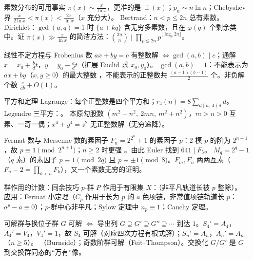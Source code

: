 \begin{结论}{素数分布的可用事实}
$\pi(x)\sim\frac{x}{\ln x}$，更准的是 $\operatorname{li}(x)$；$p_n\sim n\ln n$；Chebyshev 界 $\frac{x}{2\ln x}<\pi(x)<\frac{2x}{\ln x}$（$x$ 充分大）。
Bertrand：$n<p\le2n$ 总有素数。Dirichlet：$\gcd(a,q)=1$ 时 $\{a+kq\}$ 含无穷多素数，且在 $\varphi(q)$ 个剩余类中。证 $\pi(x)\gg\frac{x}{\ln x}$ 的简洁方法：$\binom{2n}{n}\mid\prod_{p\le2n}p^{\lfloor\log_p2n\rfloor}$。
\end{结论}

\begin{结论}{线性不定方程与 Frobenius 数}
$ax+by=c$ 有整数解 $\iff\gcd(a,b)\mid c$；通解 $x=x_0+\frac{b}{d}t$，$y=y_0-\frac adt$（扩展 Euclid 求 $x_0,y_0$）。
$\gcd(a,b)=1$：不能表示为 $ax+by$（$x,y\ge0$）的最大整数 ，不能表示的正整数共 $\frac{(a-1)(b-1)}2$ 个。非负解个数 $\frac{c}{ab}+O(1)$。
\end{结论}

\begin{结论}{平方和定理}
Lagrange：每个正整数是四个平方和；$r_4(n)=8\sum_{d\mid n,\ 4\nmid d}d$。Legendre 三平方：。
本原勾股数 $(m^2-n^2,\ 2mn,\ m^2+n^2)$，$m>n>0$ 互素、一奇一偶；$x^4+y^4=z^2$ 无正整数解（无穷递降）。
\end{结论}

\begin{结论}{Fermat 数与 Mersenne 数的素因子}
$F_n=2^{2^n}+1$ 的素因子 $p$：$2$ 模 $p$ 的阶为 $2^{n+1}$，故 $p\equiv1\pmod{2^{n+1}}$；$n\ge2$ 时更强 。由此 Euler 找到 $641\mid F_5$。
$M_q=2^q-1$（$q$ 素）的素因子 $p\equiv1\pmod{2q}$ 且 $p\equiv\pm1\pmod8$。$F_m,F_n$ 两两互素（$F_n-2=\prod_{k<n}F_k$），又一个素数无穷的证明。
\end{结论}

\begin{结论}{群作用的计数：同余技巧}
$p$-群 $P$ 作用于有限集 $X$：（非平凡轨道长被 $p$ 整除）。
应用：Fermat 小定理（$C_p$ 作用于长为 $p$ 的 $a$ 色项链，非常值项链轨道长 $p$：$a^p-a\equiv0$）；$p$-群中心非平凡；Sylow 定理中 $n_p\equiv1$；Cauchy 定理。
\end{结论}

\begin{结论}{可解群与换位子群}
$G$ 可解 $\iff$ 导出列 $G\supseteq G'\supseteq G''\supseteq\cdots$ 到达 $1$。$S_4'=A_4$，$A_4'=V_4$，$V_4'=1$，故 $S_4$ 可解（对应四次方程有根式解）；$S_n'=A_n$，$A_n'=A_n$（$n\ge5$）。
（Burnside）；奇数阶群可解（Feit--Thompson）。交换化 $G/G'$ 是 $G$ 到交换群同态的“万有”像。
\end{结论}

